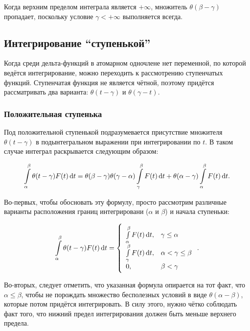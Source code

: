 \documentclass[a4paper, 12pt]{article}
\begin{document}
Когда верхним пределом интеграла является $+\infty$, множитель $\theta(\beta - \gamma)$ пропадает, поскольку условие $\gamma < +\infty$ выполняется всегда.

\subsection{Интегрирование ``ступенькой''}

Когда среди дельта-функций в атомарном одночлене нет переменной, по которой ведётся интегрирование, можно переходить к рассмотрению ступенчатых функций. Ступенчатая функция не является чётной, поэтому придётся рассматривать два варианта: $\theta(t - \gamma)$ и $\theta(\gamma - t)$.

\subsubsection{Положительная ступенька}

Под положительной ступенькой подразумевается присутствие множителя $\theta(t - \gamma)$ в подынтегральном выражении при интегрировании по $t$. В таком случае интеграл раскрывается следующим образом:

\begin{equation}
  \label{eq:int2}
  \int\limits_{\alpha}^{\beta} \theta(t - \gamma) F(t) \dif t
  = \theta(\beta - \gamma) \theta(\gamma - \alpha) \int\limits_{\gamma}^{\beta} F(t) \dif t
  + \theta(\alpha - \gamma) \int\limits_{\alpha}^{\beta} F(t) \dif t.
\end{equation}

Во-первых, чтобы обосновать эту формулу, просто рассмотрим различные варианты расположения границ интегрировани ($\alpha$ и $\beta$) и начала ступеньки:

\begin{equation*}
  \int\limits_{\alpha}^{\beta} \theta(t - \gamma) F(t) \dif t
  = \left\{
    \begin{array}{ll}
      \int\limits_{\alpha}^{\beta} F(t) \dif t, &\gamma \leq \alpha \\
      \int\limits_{\gamma}^{\beta} F(t) \dif t, &\alpha < \gamma \leq \beta \\
      0, &\beta < \gamma
    \end{array}
  \right. .
\end{equation*}

Во-вторых, следует отметить, что указанная формула опирается на тот факт, что $\alpha \leq \beta$, чтобы не порождать множество бесполезных условий в виде $\theta(\alpha - \beta)$, которые потом придётся интегрировать. В силу этого, нужно чётко соблюдать факт того, что нижний предел интегрирования должен быть меньше верхнего предела.
\end{document}
